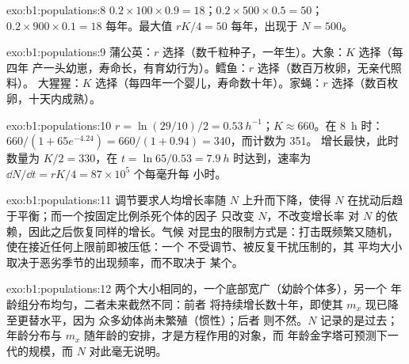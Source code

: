 \begin{solution}{exo:b1:populations:8}
$0.2\times 100\times 0.9 = 18$；$0.2\times 500\times 0.5 = 50$；
$0.2\times 900\times 0.1 = 18$ 每年。最大值 $rK/4 = 50$ 每年，出现于
$N = 500$。
\end{solution}

\begin{solution}{exo:b1:populations:9}
蒲公英：$r$ 选择（数千粒种子，一年生）。大象：$K$ 选择（每四年
产一头幼崽，寿命长，有育幼行为）。鳕鱼：$r$ 选择（数百万枚卵，无亲代照料）。
大猩猩：$K$ 选择（每四年一个婴儿，寿命数十年）。家蝇：$r$
选择（数百枚卵，十天内成熟）。
\end{solution}

\begin{solution}{exo:b1:populations:10}
$r = \ln(29/10)/2 = \qty{0.53}{h^{-1}}$；$K \approx 660$。在 \qty{8}{h} 时：
$660/(1 + 65e^{-4.24}) = 660/(1 + 0.94) = 340$，而计数为 351。
增长最快，此时数量为 $K/2 = 330$，在 $t = \ln 65/0.53 = \qty{7.9}{h}$
时达到，速率为 $\dd N/\dd t = rK/4 = 87\times 10^5$ 个每毫升每
小时。
\end{solution}

\begin{solution}{exo:b1:populations:11}
调节要求人均增长率随 $N$ 上升而下降，使得
$N$ 在扰动后趋于平衡；而一个按固定比例杀死个体的因子
只改变 $N$，不改变增长率
对 $N$ 的依赖，因此之后恢复同样的增长。气候
对昆虫的限制方式是：打击既频繁又随机，
使在接近任何上限前即被压低：一个
不受调节、被反复干扰压制的，其
平均大小取决于恶劣季节的出现频率，而不取决于
某个。
\end{solution}

\begin{solution}{exo:b1:populations:12}
两个大小相同的，一个底部宽广（幼龄个体多），另一个
年龄组分布均匀，二者未来截然不同：前者
将持续增长数十年，即使其 $m_x$ 现已降至更替水平，因为
众多幼体尚未繁殖（惯性）；后者
则不然。$N$ 记录的是过去；年龄分布与
$m_x$ 随年龄的安排，才是方程作用的对象，而
年龄金字塔可预测下一代的规模，而 $N$
对此毫无说明。
\end{solution}

